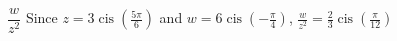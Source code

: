 { $\dfrac{w}{z^2}$ }
{ Since $z = 3\operatorname{cis}\left(\frac{5\pi}{6}\right)$ and $w = 6\operatorname{cis}\left(-\frac{\pi}{4}\right)$,  $\frac{w}{z^2} =\frac{2}{3}\operatorname{cis}\left(\frac{\pi}{12}\right)$}
